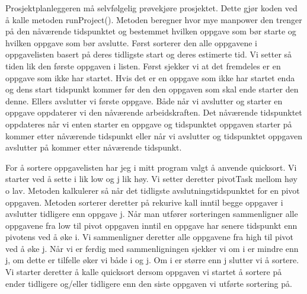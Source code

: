 \documentclass[]{article}
\begin{document}
Prosjektplanleggeren må selvfølgelig prøvekjøre prosjektet. Dette gjør koden ved å kalle metoden runProject(). Metoden beregner hvor mye manpower den trenger på den nåværende tidspunktet og bestemmet hvilken oppgave som bør starte og hvilken oppgave som bør avslutte. Først sorterer den alle oppgavene i oppgavelisten basert på deres tidligste start og deres estimerte tid. Vi setter så tiden lik den første oppgaven i listen. Først sjekker vi at det fremdeles er en oppgave som ikke har startet. Hvis det er en oppgave som ikke har startet enda og dens start tidspunkt kommer før den den oppgaven som skal ende starter den denne. Ellers avslutter vi første oppgave. Både når vi avslutter og starter en oppgave oppdaterer vi den nåværende arbeidskraften. Det nåværende tidspunktet oppdateres når vi enten starter en oppgave og tidspunktet oppgaven starter på kommer etter nåværende tidspunkt eller når vi avslutter og tidspunktet oppgaven avslutter på kommer etter nåværende tidspunkt. 

For å sortere oppgavelisten har jeg i mitt program valgt å anvende quicksort. Vi starter ved å sette i lik low og j lik høy. Vi setter deretter pivotTask mellom høy o lav. Metoden kalkulerer så når det tidligste avslutningstidspunktet for en pivot oppgaven. Metoden sorterer deretter på rekurive kall inntil begge oppgaver i avslutter tidligere enn oppgave j. Når man utfører sorteringen sammenligner alle oppgavene fra low til pivot oppgaven inntil en oppgave har senere tidspunkt enn pivotens ved å øke i. Vi sammenligner deretter alle oppgavene fra high til pivot ved å øke j. Når vi er ferdig med sammenligningen sjekker vi om i er mindre enn j, om dette er tilfelle øker vi både i og j. Om i er større enn j slutter vi å sortere. Vi starter deretter å kalle quicksort dersom oppgaven vi startet å sortere på ender tidligere og/eller tidligere enn den siste oppgaven vi utførte sortering på.
\end{document}
